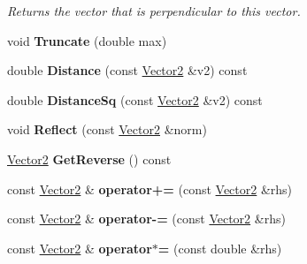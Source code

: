 \begin{DoxyCompactItemize}
\begin{DoxyCompactList}\small\item\em Returns the vector that is perpendicular to this vector. \end{DoxyCompactList}\item 
\hypertarget{structsteer_1_1_vector2_a92845bc9c24cb14bbb1ae3702b626ef3}{void {\bfseries Truncate} (double max)}\label{structsteer_1_1_vector2_a92845bc9c24cb14bbb1ae3702b626ef3}

\item 
\hypertarget{structsteer_1_1_vector2_a970134ff890ad7bf153843000a76215c}{double {\bfseries Distance} (const \hyperlink{structsteer_1_1_vector2}{Vector2} \&v2) const }\label{structsteer_1_1_vector2_a970134ff890ad7bf153843000a76215c}

\item 
\hypertarget{structsteer_1_1_vector2_a1a6c9ab976c106ec78119178136659dd}{double {\bfseries Distance\-Sq} (const \hyperlink{structsteer_1_1_vector2}{Vector2} \&v2) const }\label{structsteer_1_1_vector2_a1a6c9ab976c106ec78119178136659dd}

\item 
\hypertarget{structsteer_1_1_vector2_aa2379c044c2f75d22d359261316dd58d}{void {\bfseries Reflect} (const \hyperlink{structsteer_1_1_vector2}{Vector2} \&norm)}\label{structsteer_1_1_vector2_aa2379c044c2f75d22d359261316dd58d}

\item 
\hypertarget{structsteer_1_1_vector2_addebc491cb942193b6a5699747ab75fe}{\hyperlink{structsteer_1_1_vector2}{Vector2} {\bfseries Get\-Reverse} () const }\label{structsteer_1_1_vector2_addebc491cb942193b6a5699747ab75fe}

\item 
\hypertarget{structsteer_1_1_vector2_ae69f4a22a7d3afc6b51d940c23a9e53e}{const \hyperlink{structsteer_1_1_vector2}{Vector2} \& {\bfseries operator+=} (const \hyperlink{structsteer_1_1_vector2}{Vector2} \&rhs)}\label{structsteer_1_1_vector2_ae69f4a22a7d3afc6b51d940c23a9e53e}

\item 
\hypertarget{structsteer_1_1_vector2_a3463f6acec1d0128e4df31e2bfe7e85d}{const \hyperlink{structsteer_1_1_vector2}{Vector2} \& {\bfseries operator-\/=} (const \hyperlink{structsteer_1_1_vector2}{Vector2} \&rhs)}\label{structsteer_1_1_vector2_a3463f6acec1d0128e4df31e2bfe7e85d}

\item 
\hypertarget{structsteer_1_1_vector2_aae8fe5be70d98313785f7982aaa1e017}{const \hyperlink{structsteer_1_1_vector2}{Vector2} \& {\bfseries operator$\ast$=} (const double \&rhs)}\label{structsteer_1_1_vector2_aae8fe5be70d98313785f7982aaa1e017}


\end{DoxyCompactItemize}
